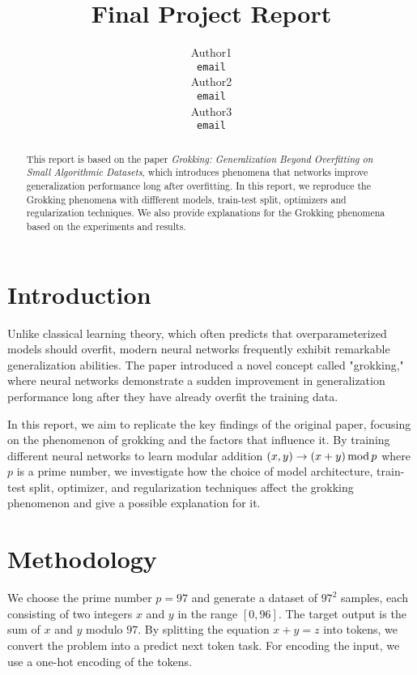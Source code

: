 \documentclass{article}
\title{Final Project Report}
\author{
    Author1 \\
    \texttt{email} \\
    \And
    Author2 \\
    \texttt{email} \\
    \And
    Author3 \\
    \texttt{email} \\
}
\begin{document}
\maketitle

\begin{abstract}
    This report is based on the paper \textit{Grokking: Generalization Beyond Overfitting on Small Algorithmic Datasets}, which introduces phenomena that networks improve generalization performance long after overfitting. In this report, we reproduce the Grokking phenomena with diffferent models, train-test split, optimizers and regularization techniques. We also provide explanations for the Grokking phenomena based on the experiments and results.
\end{abstract}

\section{Introduction}

Unlike classical learning theory, which often predicts that overparameterized models should overfit, modern neural networks frequently exhibit remarkable generalization abilities. The paper introduced a novel concept called "grokking," where neural networks demonstrate a sudden improvement in generalization performance long after they have already overfit the training data.

In this report, we aim to replicate the key findings of the original paper, focusing on the phenomenon of grokking and the factors that influence it. By training different neural networks to learn modular addition $(x, y) \rightarrow (x + y)\, {\rm mod}\, p$ where $p$ is a prime number, we investigate how the choice of model architecture, train-test split, optimizer, and regularization techniques affect the grokking phenomenon and give a possible explanation for it.

\section{Methodology}

We choose the prime number $p=97$ and generate a dataset of $97^2$ samples, each consisting of two integers $x$ and $y$ in the range $[0, 96]$. The target output is the sum of $x$ and $y$ modulo $97$. By splitting the equation $x + y = z$ into tokens, we convert the problem into a predict next token task. For encoding the input, we use a one-hot encoding of the tokens.
\end{document}
